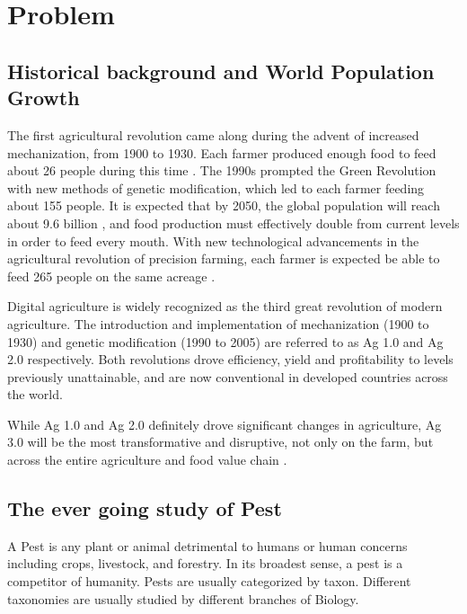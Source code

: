 

\section{Problem} %
\label{sec:problem}

\subsection{Historical background and World Population Growth} %
\label{subsec:historical_background}

The first agricultural revolution came along during the advent of increased mechanization, from 1900 to 1930. Each farmer produced enough food to feed about 26 people during this time \cite{DongoskiRob}.
%
The 1990s prompted the Green Revolution with new methods of genetic modification, which led to each farmer feeding about 155 people.
%
It is expected that by 2050, the global population will reach about 9.6 billion \cite{DESA2015}, and food production must effectively double from current levels in order to feed every mouth. With new technological advancements in the agricultural revolution of precision farming, each farmer is expected be able to feed 265 people on the same acreage \cite{DongoskiRob}.

Digital agriculture is widely recognized as the third great revolution of modern agriculture. The introduction and implementation of mechanization (1900 to 1930) and genetic modification (1990 to 2005) are referred to as Ag 1.0 and Ag 2.0 respectively. Both revolutions drove efficiency, yield and profitability to levels previously unattainable, and are now conventional in developed countries across the world.

While Ag 1.0 and Ag 2.0 definitely drove significant changes in agriculture, Ag 3.0 will be the most transformative and disruptive, not only on the farm, but across the entire agriculture and food value chain \cite{Lewis&ClarkVentures}.

\subsection{The ever going study of Pest}
\label{subsec:evergoing_study_pest}

A Pest is any plant or animal detrimental to humans or human concerns including crops, livestock, and forestry. In its broadest sense, a pest is a competitor of humanity. Pests are usually categorized by taxon. Different taxonomies are usually studied by different branches of Biology. 

